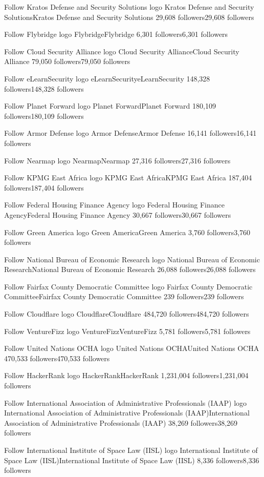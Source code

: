 Follow
Kratos Defense and Security Solutions logo
Kratos Defense and Security SolutionsKratos Defense and Security Solutions
29,608 followers29,608 followers

Follow
Flybridge logo
FlybridgeFlybridge
6,301 followers6,301 followers

Follow
Cloud Security Alliance logo
Cloud Security AllianceCloud Security Alliance
79,050 followers79,050 followers

Follow
eLearnSecurity logo
eLearnSecurityeLearnSecurity
148,328 followers148,328 followers

Follow
Planet Forward logo
Planet ForwardPlanet Forward
180,109 followers180,109 followers

Follow
Armor Defense logo
Armor DefenseArmor Defense
16,141 followers16,141 followers

Follow
Nearmap logo
NearmapNearmap
27,316 followers27,316 followers

Follow
KPMG East Africa logo
KPMG East AfricaKPMG East Africa
187,404 followers187,404 followers

Follow
Federal Housing Finance Agency logo
Federal Housing Finance AgencyFederal Housing Finance Agency
30,667 followers30,667 followers

Follow
Green America logo
Green AmericaGreen America
3,760 followers3,760 followers

Follow
National Bureau of Economic Research logo
National Bureau of Economic ResearchNational Bureau of Economic Research
26,088 followers26,088 followers

Follow
Fairfax County Democratic Committee logo
Fairfax County Democratic CommitteeFairfax County Democratic Committee
239 followers239 followers

Follow
Cloudflare logo
CloudflareCloudflare
484,720 followers484,720 followers

Follow
VentureFizz logo
VentureFizzVentureFizz
5,781 followers5,781 followers

Follow
United Nations OCHA logo
United Nations OCHAUnited Nations OCHA
470,533 followers470,533 followers

Follow
HackerRank logo
HackerRankHackerRank
1,231,004 followers1,231,004 followers

Follow
International Association of Administrative Professionals (IAAP) logo
International Association of Administrative Professionals (IAAP)International Association of Administrative Professionals (IAAP)
38,269 followers38,269 followers

Follow
International Institute of Space Law (IISL) logo
International Institute of Space Law (IISL)International Institute of Space Law (IISL)
8,336 followers8,336 followers

